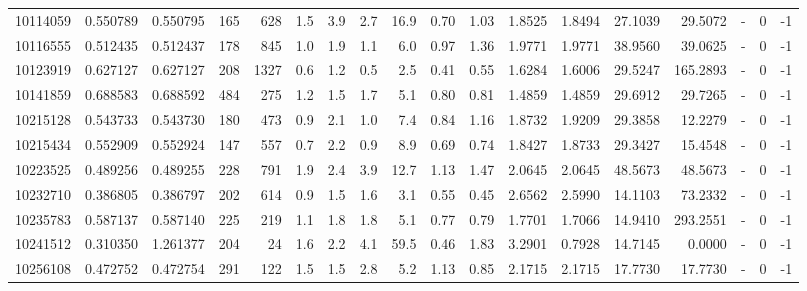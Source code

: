 \begin{tabular}{rrrrrrrrrrrrrrrlrr}
  10114059 & 0.550789 &   0.550795 &  165 &  628 &      1.5 &      3.9 &     2.7 &     16.9 &       0.70 &        1.03 &  1.8525 &  1.8494 &   27.1039 &   29.5072 &             - &        0 &         -1 \\
  10116555 & 0.512435 &   0.512437 &  178 &  845 &      1.0 &      1.9 &     1.1 &      6.0 &       0.97 &        1.36 &  1.9771 &  1.9771 &   38.9560 &   39.0625 &             - &        0 &         -1 \\
  10123919 & 0.627127 &   0.627127 &  208 & 1327 &      0.6 &      1.2 &     0.5 &      2.5 &       0.41 &        0.55 &  1.6284 &  1.6006 &   29.5247 &  165.2893 &             - &        0 &         -1 \\
  10141859 & 0.688583 &   0.688592 &  484 &  275 &      1.2 &      1.5 &     1.7 &      5.1 &       0.80 &        0.81 &  1.4859 &  1.4859 &   29.6912 &   29.7265 &             - &        0 &         -1 \\
  10215128 & 0.543733 &   0.543730 &  180 &  473 &      0.9 &      2.1 &     1.0 &      7.4 &       0.84 &        1.16 &  1.8732 &  1.9209 &   29.3858 &   12.2279 &             - &        0 &         -1 \\
  10215434 & 0.552909 &   0.552924 &  147 &  557 &      0.7 &      2.2 &     0.9 &      8.9 &       0.69 &        0.74 &  1.8427 &  1.8733 &   29.3427 &   15.4548 &             - &        0 &         -1 \\
  10223525 & 0.489256 &   0.489255 &  228 &  791 &      1.9 &      2.4 &     3.9 &     12.7 &       1.13 &        1.47 &  2.0645 &  2.0645 &   48.5673 &   48.5673 &             - &        0 &         -1 \\
  10232710 & 0.386805 &   0.386797 &  202 &  614 &      0.9 &      1.5 &     1.6 &      3.1 &       0.55 &        0.45 &  2.6562 &  2.5990 &   14.1103 &   73.2332 &             - &        0 &         -1 \\
  10235783 & 0.587137 &   0.587140 &  225 &  219 &      1.1 &      1.8 &     1.8 &      5.1 &       0.77 &        0.79 &  1.7701 &  1.7066 &   14.9410 &  293.2551 &             - &        0 &         -1 \\
  10241512 & 0.310350 &   1.261377 &  204 &   24 &      1.6 &      2.2 &     4.1 &     59.5 &       0.46 &        1.83 &  3.2901 &  0.7928 &   14.7145 &    0.0000 &             - &        0 &         -1 \\
  10256108 & 0.472752 &   0.472754 &  291 &  122 &      1.5 &      1.5 &     2.8 &      5.2 &       1.13 &        0.85 &  2.1715 &  2.1715 &   17.7730 &   17.7730 &             - &        0 &         -1 \\

\end{tabular}
